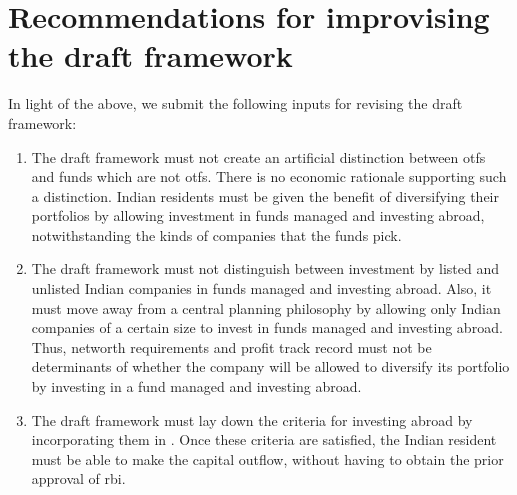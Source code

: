 \documentclass[11pt,a4paper]{article} \usepackage[parfill]{parskip}
\begin{document}
\begin{description}
\end{description}



\section{Recommendations for improvising the draft framework}

In light of the above, we submit the following inputs for revising the
draft framework:

\begin{enumerate}
\item The draft framework must not create an artificial distinction
  between \glspl{otf} and funds which are not \glspl{otf}. There is no
  economic rationale supporting such a distinction. Indian residents
  must be given the benefit of diversifying their portfolios by
  allowing investment in funds managed and investing abroad,
  notwithstanding the kinds of companies that the funds pick.

\item The draft framework must not distinguish between investment by
  listed and unlisted Indian companies in funds managed and investing
  abroad. Also, it must move away from a central planning philosophy
  by allowing only Indian companies of a certain size to invest in
  funds managed and investing abroad. Thus, networth requirements and
  profit track record must not be determinants of whether the company
  will be allowed to diversify its portfolio by investing in a fund
  managed and investing abroad.

\item The draft framework must lay down the criteria for investing
  abroad by incorporating them in . Once these
  criteria are satisfied, the Indian resident must be able to make the
  capital outflow, without having to obtain the prior approval of
  \gls{rbi}.
\end{enumerate}



\printbibliography
\end{document}
